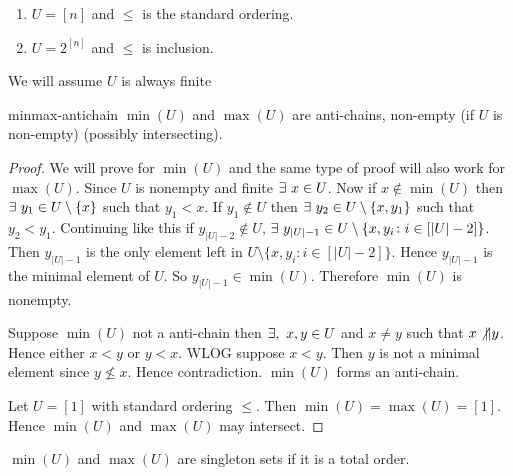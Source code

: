 \begin{Example}{}{}
	\begin{enumerate}[label=(\alph*)]
		\item $U=[n]$ and $\leq $ is the standard ordering.
		\item $U=2^{[n]}$ and $\leq $ is inclusion. 
	\end{enumerate}
\end{Example}


\begin{assumption*}
	We will assume $U$ is always finite
\end{assumption*}
\begin{lemma}{}{minmax-antichain}
	$\min (U)$ and $\max{(U)}$ are anti-chains, non-empty (if $U$ is non-empty) (possibly intersecting).
\end{lemma}
\begin{proof}
	We will prove for $\min(U)$ and the same type of proof will also work for $\max(U)$. Since $U$ is nonempty and finite $\exists \ x\in U$. Now if $x\notin \min(U)$ then $\exists\ y_1\in U\setminus\{x\}$ such that $y_1<x$. If $y_1\notin U$ then $\exists\ y_2\in U\setminus\{x,y_1\}$ such that $y_2<y_1$. Continuing like this if $y_{|U|-2}\notin U$, $\exists\ y_{|U|-1}\in U\setminus\{x,y_i\colon i\in[|U|-2]\}$. Then $y_{|U|-1}$ is the only element left in $U\setminus\{x,y_i\colon i\in[|U|-2]\}$. Hence $y_{|U|-1}$ is the minimal element of $U$. So $y_{|U|-1}\in \min(U)$. Therefore $\min(U)$ is nonempty.
	
	 Suppose $\min(U)$  not a anti-chain then $\exists,\ x,y\in U$ and $x\neq y$ such that $x\not\| y$. Hence either $x<y$ or $y<x$. WLOG suppose $x<y$. Then $y$ is not a minimal element since $y\not\leq x$. Hence contradiction. $\min(U)$ forms an anti-chain.
	 
	 Let $U=[1]$ with standard ordering $\leq$. Then $\min(U)=\max(U)=[1]$. Hence $\min(U)$ and $\max(U)$ may intersect. 
\end{proof}
\begin{observation*}
	$\min(U)$ and $\max(U)$ are singleton sets  if it is a total order. 
\end{observation*}

